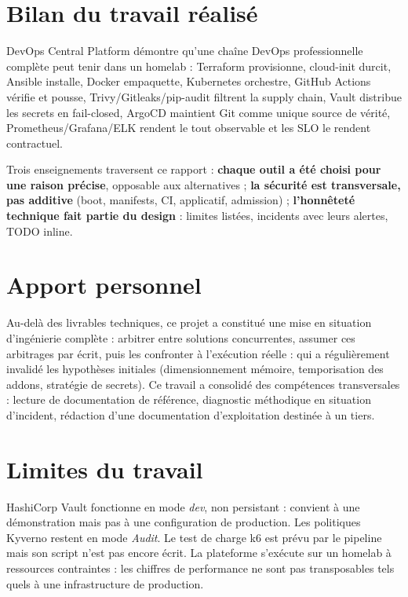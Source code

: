 \documentclass[12pt,a4paper,oneside]{report}
\begin{document}
\section*{Bilan du travail réalisé}

DevOps Central Platform démontre qu'une chaîne DevOps professionnelle complète peut tenir dans un homelab : Terraform provisionne, cloud-init durcit, Ansible installe, Docker empaquette, Kubernetes orchestre, GitHub Actions vérifie et pousse, Trivy/Gitleaks/pip-audit filtrent la supply chain, Vault distribue les secrets en fail-closed, ArgoCD maintient Git comme unique source de vérité, Prometheus/Grafana/ELK rendent le tout observable et les SLO le rendent contractuel.

Trois enseignements traversent ce rapport : \textbf{chaque outil a été choisi pour une raison précise}, opposable aux alternatives ; \textbf{la sécurité est transversale, pas additive} (boot, manifests, CI, applicatif, admission) ; \textbf{l'honnêteté technique fait partie du design} : limites listées, incidents avec leurs alertes, TODO inline.

\section*{Apport personnel}

Au-delà des livrables techniques, ce projet a constitué une mise en situation d'ingénierie complète : arbitrer entre solutions concurrentes, assumer ces arbitrages par écrit, puis les confronter à l'exécution réelle : qui a régulièrement invalidé les hypothèses initiales (dimensionnement mémoire, temporisation des addons, stratégie de secrets). Ce travail a consolidé des compétences transversales : lecture de documentation de référence, diagnostic méthodique en situation d'incident, rédaction d'une documentation d'exploitation destinée à un tiers.

\section*{Limites du travail}

HashiCorp Vault fonctionne en mode \emph{dev}, non persistant : convient à une démonstration mais pas à une configuration de production. Les politiques Kyverno restent en mode \emph{Audit}. Le test de charge k6 est prévu par le pipeline mais son script n'est pas encore écrit. La plateforme s'exécute sur un homelab à ressources contraintes : les chiffres de performance ne sont pas transposables tels quels à une infrastructure de production.
\end{document}
